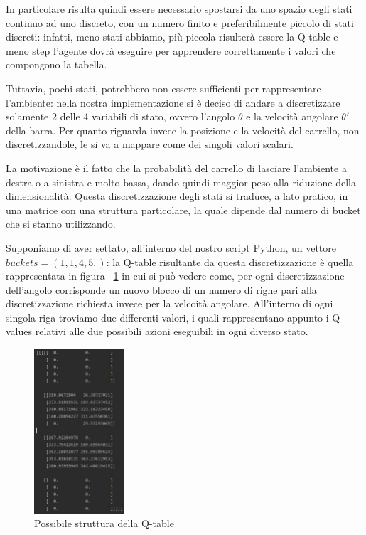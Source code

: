 In particolare risulta quindi essere necessario spostarsi da uno spazio degli stati continuo ad uno discreto, con un numero finito e preferibilmente piccolo di stati discreti: infatti, meno stati abbiamo, più piccola risulterà essere la Q-table e meno step l'agente dovrà eseguire per apprendere correttamente i valori che compongono la tabella. 

Tuttavia, pochi stati, potrebbero non essere sufficienti per rappresentare l'ambiente: nella nostra implementazione si è deciso di andare a discretizzare solamente 2 delle 4 variabili di stato, ovvero l'angolo $\theta$ e la velocità angolare $\theta'$ della barra. Per quanto riguarda invece la posizione e la velocità del carrello, non discretizzandole, le si va a mappare come dei singoli valori scalari.

La motivazione è il fatto che la probabilità del carrello di lasciare l'ambiente a destra o a sinistra e molto bassa, dando quindi maggior peso alla riduzione della dimensionalità.
Questa discretizzazione degli stati si traduce, a lato pratico, in una matrice con una struttura particolare, la quale dipende dal numero di bucket che si stanno utilizzando.

Supponiamo di aver settato, all'interno del nostro script Python, un vettore $buckets=(1, 1, 4, 5,)$: la Q-table risultante da questa discretizzazione è quella rappresentata in figura ~\ref{fig:Q_table_example} in cui si può vedere come, per ogni discretizzazione dell'angolo corrisponde un nuovo blocco di un numero di righe pari alla discretizzazione richiesta invece per la velcoità angolare. All'interno di ogni singola riga troviamo due differenti valori, i quali rappresentano appunto i Q-values relativi alle due possibili azioni eseguibili in ogni diverso stato.

\begin{figure}[!h]
	\centering
	\includegraphics[width=0.3\textwidth]{Immagini/Example_of_Q_table.JPG}
	\caption{Possibile struttura della Q-table}
	\label{fig:Q_table_example}
\end{figure}

